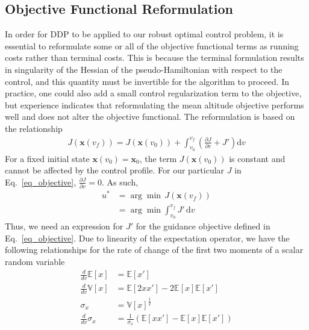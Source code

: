 \documentclass[journal ]{new-aiaa}
\newcommand{\state}{\ensuremath{\mathbf{x}}}
\newcommand{\E}[1]{\mathbb{E}\left[#1\right]}
\newcommand{\V}[1]{\mathbb{V}[#1]}
\begin{document}
\subsection*{Objective Functional Reformulation}
In order for DDP to be applied to our robust optimal control problem, it is essential to reformulate some or all of the objective functional terms as running costs rather than terminal costs. This is because the terminal formulation results in singularity of the Hessian of the pseudo-Hamiltonian with respect to the control, and this quantity must be invertible for the algorithm to proceed. In practice, one could also add a small control regularization term to the objective, but experience indicates that reformulating the mean altitude objective performs well and does not alter the objective functional. The reformulation is based on the relationship 
\begin{align}
	J(\state(v_f)) = J(\state(v_0)) + \int_{v_0}^{v_f}\left(\frac{\partial J}{\partial v} + J'\right)\mathrm{d}v \label{Eq:GenericCostRate}
\end{align}
For a fixed initial state $\state(v_0)=\state_0$, the term $J(\state(v_0))$ is constant and cannot be affected by the control profile. For our particular $J$ in Eq.~\eqref{eq_objective}, $\frac{\partial J}{\partial v} = 0$. As such, 
\begin{align}
	u^* &= \arg\min \,J(\state(v_f)) \\
	    &= \arg\min\int_{v_0}^{v_f}J'\,\mathrm{d}v
\end{align}
Thus, we need an expression for $J'$ for the guidance objective defined in Eq.~\eqref{eq_objective}. Due to linearity of the expectation operator, we have the following relationships for the rate of change of the first two moments of a scalar random variable
\begin{align}
	\frac{d }{d v}\E{x} &= \E{x'} \label{Eq:MeanRateVel}\\
	\frac{d }{d v}\V{x} &= \E{2xx'} - 2\E{x}\E{x'} \\
	\sigma_x &= \V{x}^{\frac{1}{2}} \\
	\frac{d }{d v}\sigma_x &= \frac{1}{\sigma_x}\left(\E{xx'} - \E{x}\E{x'}\right) \label{Eq:StdRateVel}
\end{align}
\end{document}

